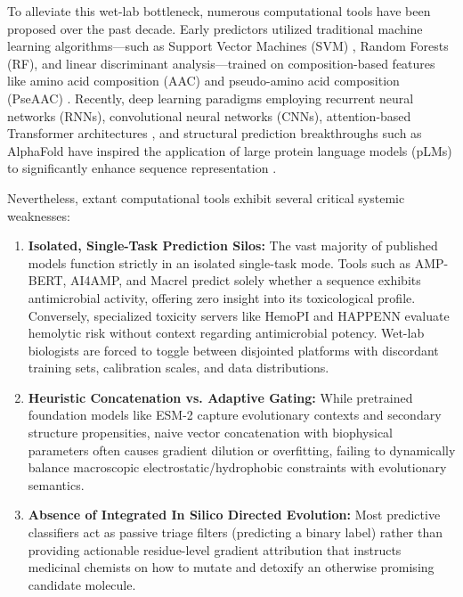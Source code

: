 \documentclass[11pt,a4paper]{article}
\begin{document}
To alleviate this wet-lab bottleneck, numerous computational tools have been proposed over the past decade. Early predictors utilized traditional machine learning algorithms---such as Support Vector Machines (SVM) \cite{pedregosa2011scikit}, Random Forests (RF), and linear discriminant analysis---trained on composition-based features like amino acid composition (AAC) and pseudo-amino acid composition (PseAAC) \cite{chaudhary2016hemopi}. Recently, deep learning paradigms employing recurrent neural networks (RNNs), convolutional neural networks (CNNs), attention-based Transformer architectures \cite{vaswani2017attention}, and structural prediction breakthroughs such as AlphaFold \cite{jumper2021highly} have inspired the application of large protein language models (pLMs) to significantly enhance sequence representation \cite{veltri2018deep, yan2020deep, santos2020macrel, lin2023evolutionary}.

Nevertheless, extant computational tools exhibit several critical systemic weaknesses:
\begin{enumerate}
    \item \textbf{Isolated, Single-Task Prediction Silos:} The vast majority of published models function strictly in an isolated single-task mode. Tools such as AMP-BERT, AI4AMP, and Macrel \cite{santos2020macrel} predict solely whether a sequence exhibits antimicrobial activity, offering zero insight into its toxicological profile. Conversely, specialized toxicity servers like HemoPI \cite{chaudhary2016hemopi} and HAPPENN \cite{plisson2020happenn} evaluate hemolytic risk without context regarding antimicrobial potency. Wet-lab biologists are forced to toggle between disjointed platforms with discordant training sets, calibration scales, and data distributions.
    \item \textbf{Heuristic Concatenation vs. Adaptive Gating:} While pretrained foundation models like ESM-2 \cite{lin2023evolutionary} capture evolutionary contexts and secondary structure propensities, naive vector concatenation with biophysical parameters often causes gradient dilution or overfitting, failing to dynamically balance macroscopic electrostatic/hydrophobic constraints with evolutionary semantics.
    \item \textbf{Absence of Integrated In Silico Directed Evolution:} Most predictive classifiers act as passive triage filters (predicting a binary label) rather than providing actionable residue-level gradient attribution that instructs medicinal chemists on how to mutate and detoxify an otherwise promising candidate molecule.
\end{enumerate}
\end{document}
